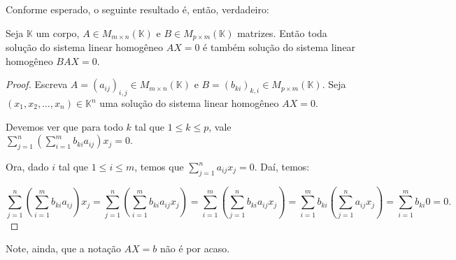 Conforme esperado, o seguinte resultado é, então, verdadeiro:

\begin{proposition}
    Seja $\mathbb K$ um corpo, $A\in M_{m \times n}(\mathbb K)$ e $B\in M_{p \times m}(\mathbb K)$ matrizes.
    Então toda solução do sistema linear homogêneo $AX=0$ é também solução do sistema linear homogêneo $BAX=0$.
\end{proposition}
\begin{proof}
    Escreva $A=(a_{ij})_{i, j}\in M_{m \times n}(\mathbb K)$ e $B=(b_{ki})_{k, i}\in M_{p \times m}(\mathbb K)$.
    Seja $(x_1, x_2, \ldots, x_n)\in \mathbb K^n$ uma solução do sistema linear homogêneo $AX=0$.

    Devemos ver que para todo $k$ tal que $1\leq k \leq p$, vale $\sum_{j=1}^n\left(\sum_{i=1}^m b_{ki} a_{ij} \right)x_j=0$.

    Ora, dado $i$ tal que $1\leq i \leq m$, temos que $\sum_{j=1}^n a_{ij} x_j=0$.
    Daí, temos:
    
    \begin{equation*}
    \sum_{j=1}^n\left(\sum_{i=1}^m b_{ki} a_{ij} \right)x_j=\sum_{j=1}^n\left(\sum_{i=1}^m b_{ki} a_{ij}x_j \right)=\sum_{i=1}^m\left(\sum_{j=1}^n b_{ki} a_{ij}x_j \right)=\sum_{i=1}^m b_{ki}\left(\sum_{j=1}^n a_{ij}x_j \right)=\sum_{i=1}^m b_{ki}0=0.
    \end{equation*}
\end{proof}

Note, ainda, que a notação $AX=b$ não é por acaso.

